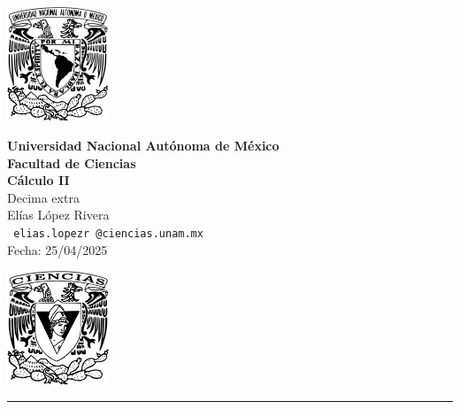\documentclass[11pt,letterpaper]{article}
\begin{document}

\begin{center}
    \begin{minipage}{3cm}
    	\begin{center}
    		\includegraphics[height=3.4cm]{logo_unam.png}
    	\end{center}
    \end{minipage}\hfill
    \begin{minipage}{10cm}
    	\begin{center}
    	\textbf{\large Universidad Nacional Autónoma de México}\\[0.1cm]
        \textbf{Facultad de Ciencias}\\[0.1cm]
        \textbf{C\'alculo II}\\[0.1cm]
        Decima extra\\[0.1cm]
         El\'ias L\'opez Rivera\\[0.1cm]
        \texttt{ elias.lopezr\,@ciencias.unam.mx }\\[0.1cm]
        Fecha:\,\,25/04/2025
    	\end{center}
    \end{minipage}\hfill
    \begin{minipage}{3cm}
    	\begin{center}
    		\includegraphics[height=3.4cm]{Logo_FC.png}
    	\end{center}
    \end{minipage}
\end{center}

\rule{17cm}{0.1mm}
\end{document}
